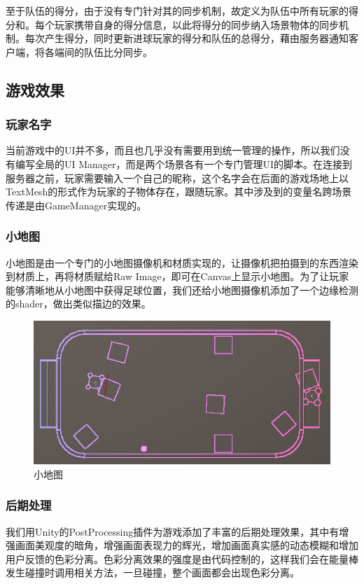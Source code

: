 \documentclass[conference]{IEEEtran}
\begin{document}
至于队伍的得分，由于没有专门针对其的同步机制，故定义为队伍中所有玩家的得分和。每个玩家携带自身的得分信息，以此将得分的同步纳入场景物体的同步机制。每次产生得分，同时更新进球玩家的得分和队伍的总得分，藉由服务器通知客户端，将各端间的队伍比分同步。

\subsection{游戏效果}
\subsubsection{玩家名字}
\quad

当前游戏中的UI并不多，而且也几乎没有需要用到统一管理的操作，所以我们没有编写全局的UI Manager，而是两个场景各有一个专门管理UI的脚本。在连接到服务器之前，玩家需要输入一个自己的昵称，这个名字会在后面的游戏场地上以TextMesh的形式作为玩家的子物体存在，跟随玩家。其中涉及到的变量名跨场景传递是由GameManager实现的。

\subsubsection{小地图}
\quad

小地图是由一个专门的小地图摄像机和材质实现的，让摄像机把拍摄到的东西渲染到材质上，再将材质赋给Raw Image，即可在Canvas上显示小地图。为了让玩家能够清晰地从小地图中获得足球位置，我们还给小地图摄像机添加了一个边缘检测的shader，做出类似描边的效果。

\begin{figure}[htbp]
  \centerline{\includegraphics[width=.38\textwidth]{images/mini-map.png}}
  \caption{小地图}
  \label{fig:minimap}
\end{figure}

\subsubsection{后期处理}
\quad

我们用Unity的PostProcessing插件为游戏添加了丰富的后期处理效果，其中有增强画面美观度的暗角，增强画面表现力的辉光，增加画面真实感的动态模糊和增加用户反馈的色彩分离。色彩分离效果的强度是由代码控制的，这样我们会在能量棒发生碰撞时调用相关方法，一旦碰撞，整个画面都会出现色彩分离。
\end{document}
